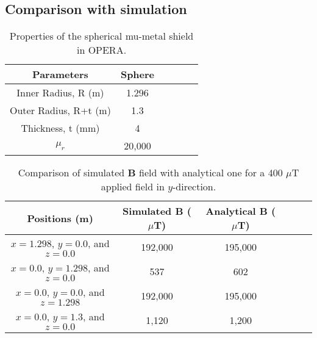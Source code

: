 \subsection{Comparison with simulation}

\begin{table} [!htb]
    \centering
    \begin{tabular} { |c|c|c|c|c|c|} 
        \hline
        Parameters & Sphere \\
        \hline\hline
        Inner Radius, R (m) & 1.296\\ 
        \hline
        Outer Radius, R+t (m) & 1.3 \\ 
        \hline
        Thickness, t (mm) & 4 \\ 
        \hline
        $\mu_r$  & 20,000 \\ 
        \hline

    \end{tabular}
    \caption{Properties of the spherical mu-metal shield in OPERA.}\label{tablE:opera_sphere}
\end{table}

\begin{table} [!htb]
    \centering
    \begin{tabular} { |c|c|c|c|c|c|} 
        \hline
        Positions (m) & Simulated $\bm{B}$ ($\mu$T) & Analytical $\bm{B}$ ($\mu$T)\\
        \hline\hline
        $x=1.298$, $y=0.0$, and $z=0.0$ & 192,000 & 195,000\\ 
        \hline
        $x=0.0$, $y=1.298$, and $z=0.0$ & 537 & 602\\ 
        \hline
        $x=0.0$, $y=0.0$, and $z=1.298$ & 192,000 & 195,000\\ 
        \hline
        $x=0.0$, $y=1.3$, and $z=0.0$ & 1,120 & 1,200\\ 
        \hline

    \end{tabular}
    \caption[Comparison of simulated $\bm{B}$ field with analytical one ]{Comparison of simulated $\bm{B}$ field with analytical one for a 400 $\mu$T applied field in $y$-direction.}\label{tablE:opera_analytical}
\end{table}

